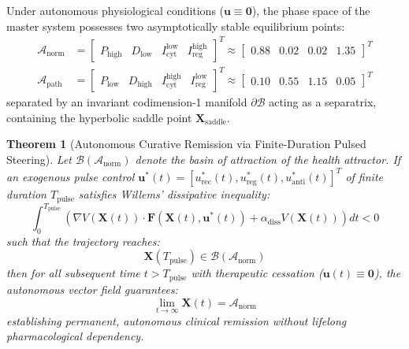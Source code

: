 \documentclass[11pt,a4paper]{article}
\newtheorem{theorem}{Theorem}
\begin{document}
Under autonomous physiological conditions ($\bm{u} \equiv \bm{0}$), the phase space of the master system possesses two asymptotically stable equilibrium points:
\begin{align}
\mathcal{A}_{\mathrm{norm}} &= \begin{bmatrix} P_{\mathrm{high}} & D_{\mathrm{low}} & I_{\mathrm{cyt}}^{\mathrm{low}} & I_{\mathrm{reg}}^{\mathrm{high}} \end{bmatrix}^T \approx \begin{bmatrix} 0.88 & 0.02 & 0.02 & 1.35 \end{bmatrix}^T \\
\mathcal{A}_{\mathrm{path}} &= \begin{bmatrix} P_{\mathrm{low}} & D_{\mathrm{high}} & I_{\mathrm{cyt}}^{\mathrm{high}} & I_{\mathrm{reg}}^{\mathrm{low}} \end{bmatrix}^T \approx \begin{bmatrix} 0.10 & 0.55 & 1.15 & 0.05 \end{bmatrix}^T
\end{align}
separated by an invariant codimension-1 manifold $\partial \mathcal{B}$ acting as a separatrix, containing the hyperbolic saddle point $\bm{X}_{\mathrm{saddle}}$.

\begin{theorem}[Autonomous Curative Remission via Finite-Duration Pulsed Steering]
Let $\mathcal{B}(\mathcal{A}_{\mathrm{norm}})$ denote the basin of attraction of the health attractor. If an exogenous pulse control $\bm{u}^*(t) = [u_{\mathrm{rec}}^*(t), u_{\mathrm{reg}}^*(t), u_{\mathrm{anti}}^*(t)]^T$ of finite duration $T_{\mathrm{pulse}}$ satisfies Willems' dissipative inequality:
\begin{equation}
\int_0^{T_{\mathrm{pulse}}} \left( \nabla V(\bm{X}(t)) \cdot \bm{F}(\bm{X}(t), \bm{u}^*(t)) + \alpha_{\mathrm{diss}} V(\bm{X}(t)) \right) dt < 0
\end{equation}
such that the trajectory reaches:
\begin{equation}
\bm{X}(T_{\mathrm{pulse}}) \in \mathcal{B}(\mathcal{A}_{\mathrm{norm}})
\end{equation}
then for all subsequent time $t > T_{\mathrm{pulse}}$ with therapeutic cessation ($\bm{u}(t) \equiv \bm{0}$), the autonomous vector field guarantees:
\begin{equation}
\lim_{t \to \infty} \bm{X}(t) = \mathcal{A}_{\mathrm{norm}}
\end{equation}
establishing permanent, autonomous clinical remission without lifelong pharmacological dependency.
\end{theorem}
\end{document}
